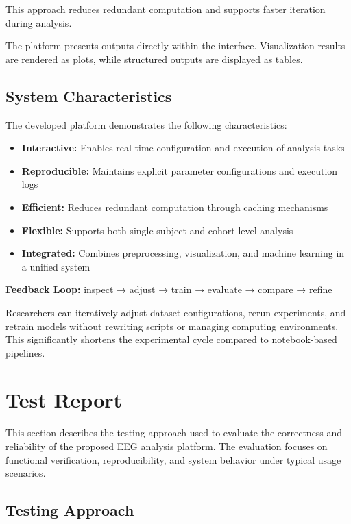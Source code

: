 This approach reduces redundant computation and supports faster iteration during analysis.

\vspace{0.5em}
The platform presents outputs directly within the interface. Visualization results are rendered as plots, while structured outputs are displayed as tables.

\subsection{System Characteristics}
\label{sec:system-characteristics}

The developed platform demonstrates the following characteristics:

\begin{itemize}
	\item \textbf{Interactive:} Enables real-time configuration and execution of analysis tasks
	\item \textbf{Reproducible:} Maintains explicit parameter configurations and execution logs
	\item \textbf{Efficient:} Reduces redundant computation through caching mechanisms
	\item \textbf{Flexible:} Supports both single-subject and cohort-level analysis
	\item \textbf{Integrated:} Combines preprocessing, visualization, and machine learning in a unified system
\end{itemize}

\vspace{1em}
\textbf{Feedback Loop:}
inspect → adjust → train → evaluate → compare → refine

Researchers can iteratively adjust dataset configurations, rerun experiments, and retrain models without rewriting scripts or managing computing environments. This significantly shortens the experimental cycle compared to notebook-based pipelines.

\section{Test Report}
\label{sec:test-report}

This section describes the testing approach used to evaluate the correctness and reliability of the proposed EEG analysis platform. The evaluation focuses on functional verification, reproducibility, and system behavior under typical usage scenarios.

\subsection{Testing Approach}

